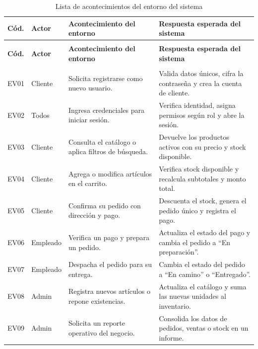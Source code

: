 {\small
\begin{xltabular}{\textwidth}{|>{\raggedright\arraybackslash}p{1.2cm}|>{\raggedright\arraybackslash}p{1.8cm}|X|X|}
    \caption{Lista de acontecimientos del entorno del sistema}
    \label{tab:acontecimientos_entorno} \\
    \hline
    \textbf{Cód.} & \textbf{Actor} & \textbf{Acontecimiento del entorno} & \textbf{Respuesta esperada del sistema} \\
    \hline
    \endfirsthead

     \\
    \hline
    \textbf{Cód.} & \textbf{Actor} & \textbf{Acontecimiento del entorno} & \textbf{Respuesta esperada del sistema} \\
    \hline
    \endhead

     \\
    \endfoot

    \endlastfoot

    EV01 & Cliente & Solicita registrarse como nuevo usuario. & Valida datos únicos, cifra la contraseña y crea la cuenta de cliente. \\*
    \hline
    EV02 & Todos & Ingresa credenciales para iniciar sesión. & Verifica identidad, asigna permisos según rol y abre la sesión. \\*
    \hline
    EV03 & Cliente & Consulta el catálogo o aplica filtros de búsqueda. & Devuelve los productos activos con su precio y stock disponible. \\*
    \hline
    EV04 & Cliente & Agrega o modifica artículos en el carrito. & Verifica stock disponible y recalcula subtotales y monto total. \\*
    \hline
    EV05 & Cliente & Confirma su pedido con dirección y pago. & Descuenta el stock, genera el pedido único y registra el pago. \\*
    \hline
    EV06 & Empleado & Verifica un pago y prepara un pedido. & Actualiza el estado del pago y cambia el pedido a ``En preparación''. \\*
    \hline
    EV07 & Empleado & Despacha el pedido para su entrega. & Cambia el estado del pedido a ``En camino'' o ``Entregado''. \\*
    \hline
    EV08 & Admin & Registra nuevos artículos o repone existencias. & Actualiza el catálogo y suma las nuevas unidades al inventario. \\*
    \hline
    EV09 & Admin & Solicita un reporte operativo del negocio. & Consolida los datos de pedidos, ventas o stock en un informe. \\
    \hline
\end{xltabular}
}

